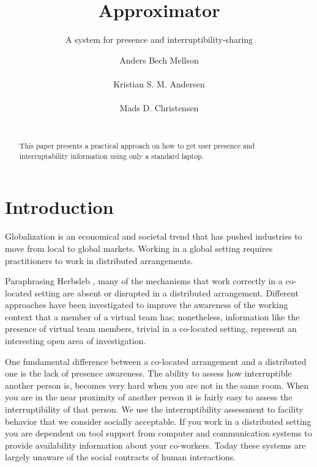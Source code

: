 \documentclass{sigchi}
\begin{document}
\title{Approximator}
\subtitle{A system for presence and interruptibility-sharing}
\author{
  \alignauthor Anders Bech Mellson\\
    \\
  \alignauthor Kristian S. M. Andersen\\
    \\
  \alignauthor Mads D. Christensen\\
    \\
}

\maketitle

\begin{abstract}
This paper presents a practical approach on how to get user presence and interruptability information using only a standard laptop.
\end{abstract}



\section{Introduction}
Globalization is an economical and societal trend that has pushed industries to move from local to global markets.
Working in a global setting requires practitioners to work in distributed arrangements.

Paraphrasing Herbsleb \cite{herbsleb2007}, many of the mechanisms that work correctly in a co-located setting are absent or disrupted in a distributed arrangement.
Different approaches have been investigated to improve the awareness of the working context that a member of a virtual team has; nonetheless, information like the presence of virtual team members, trivial in a co-located setting, represent an interesting open area of investigation.

One fundamental difference between a co-located arrangement and a distributed one is the lack of presence awareness.
The ability to assess how interruptible another person is, becomes very hard when you are not in the same room.
When you are in the near proximity of another person it is fairly easy to assess the interruptibility of that person.
We use the interruptibility assessment to facility behavior that we consider socially acceptable.
If you work in a distributed setting you are dependent on tool support from computer and communication systems to provide availability information about your co-workers.
Today these systems are largely unaware of the social contracts of human interactions.
\end{document}
